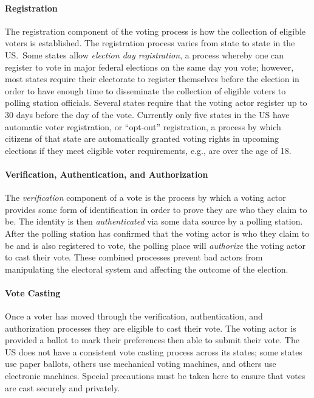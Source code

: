 \paragraph{Registration}
The registration component of the voting process is how the collection
of eligible voters is established. The registration process varies from state to
state in the US.\ Some states allow \emph{election day registration}, a process
whereby one can register to vote in major federal elections on the same day you
vote; however, most states require their electorate to register themselves
before the election in order to have enough time to disseminate the collection
of eligible voters to polling station officials. Several states require that the
voting actor register up to 30 days before the day of the vote. Currently only
five states in the US have automatic voter registration, or ``opt-out''
registration, a process by which citizens of that state are automatically
granted voting rights in upcoming elections if they meet eligible voter
requirements, e.g., are over the age of 18.

\paragraph{Verification, Authentication, and Authorization}
The \emph{verification} component of a vote is the process by which a voting
actor provides some form of identification in order to prove they are who they
claim to be. The identity is then \emph{authenticated} via some data source by a
polling station. After the polling station has confirmed that the voting actor
is who they claim to be and is also registered to vote, the polling place will
\emph{authorize} the voting actor to cast their vote. These combined processes
prevent bad actors from manipulating the electoral system and affecting the
outcome of the election.


\paragraph{Vote Casting}
Once a voter has moved through the verification, authentication, and
authorization processes they are eligible to cast their vote. The voting actor
is provided a ballot to mark their preferences then able to submit their vote.
The US does not have a consistent vote casting process across its states; some
states use paper ballots, others use mechanical voting machines, and others use
electronic machines. Special precautions must be taken here to ensure that votes
are cast securely and privately.

